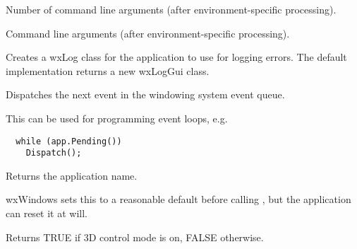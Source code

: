 Number of command line arguments (after environment-specific processing).

\label{wxappargv}


Command line arguments (after environment-specific processing).

\label{wxappcreatelogtarget}


Creates a wxLog class for the application to use for logging errors. The default
implementation returns a new wxLogGui class.



\label{wxappdispatch}


Dispatches the next event in the windowing system event queue.

This can be used for programming event loops, e.g.

\begin{verbatim}
  while (app.Pending())
    Dispatch();
\end{verbatim}



\label{wxappgetappname}


Returns the application name.


wxWindows sets this to a reasonable default before
calling , but the application can reset it at will.

\label{wxappgetauto3d}


Returns TRUE if 3D control mode is on, FALSE otherwise.



\label{wxappgetclassname}


